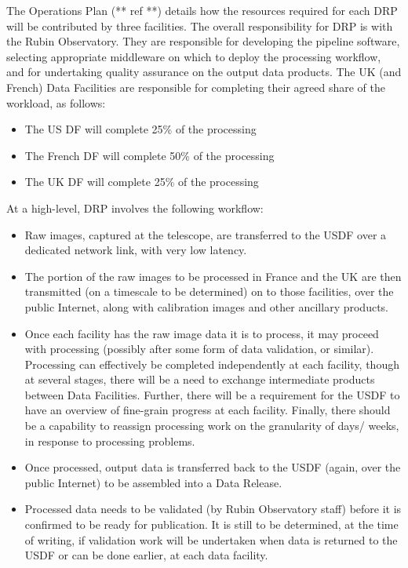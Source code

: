 The Operations Plan (** ref **) details how the resources required for
each DRP will be contributed by three facilities. The overall
responsibility for DRP is with the Rubin Observatory. They are
responsible for developing the pipeline software, selecting
appropriate middleware on which to deploy the processing workflow, and
for undertaking quality assurance on the output data products. The UK
(and French) Data Facilities are responsible for completing their
agreed share of the workload, as follows:

\begin{itemize}

\item The US DF will complete 25\% of the processing

\item The French DF will complete 50\% of the processing

\item The UK DF will complete 25\% of the processing

\end{itemize}

At a high-level, DRP involves the following workflow:

\begin{itemize}

  \item Raw images, captured at the telescope, are transferred to the
    USDF over a dedicated network link, with very low latency.

  \item The portion of the raw images to be processed in France and
    the UK are then transmitted (on a timescale to be determined) on
    to those facilities, over the public Internet, along with
    calibration images and other ancillary products.

  \item Once each facility has the raw image data it is to process, it
    may proceed with processing (possibly after some form of data
    validation, or similar). Processing can effectively be completed
    independently at each facility, though at several stages, there
    will be a need to exchange intermediate products between Data
    Facilities. Further, there will be a requirement for the USDF to
    have an overview of fine-grain progress at each facility. Finally,
    there should be a capability to reassign processing work on the
    granularity of days/ weeks, in response to processing problems.

  \item Once processed, output data is transferred back to the USDF
    (again, over the public Internet) to be assembled into a Data
    Release.

  \item Processed data needs to be validated (by Rubin Observatory
    staff) before it is confirmed to be ready for publication. It is
    still to be determined, at the time of writing, if validation work
    will be undertaken when data is returned to the USDF or can be
    done earlier, at each data facility.
    
\end{itemize}

